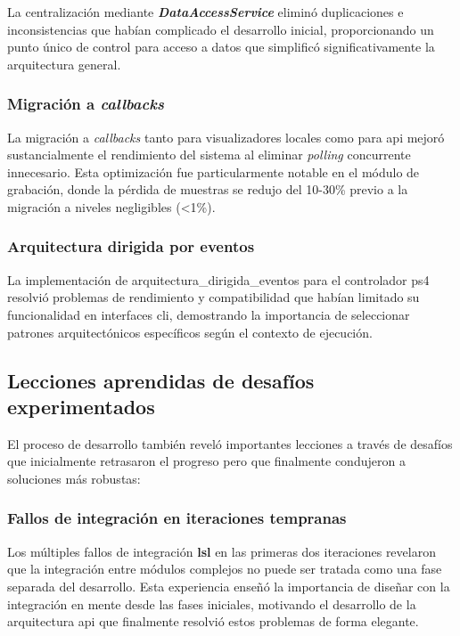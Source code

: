 La centralización mediante \textit{\textbf{DataAccessService}} eliminó duplicaciones e inconsistencias que habían complicado el desarrollo inicial, proporcionando un punto único de control para acceso a datos que simplificó significativamente la arquitectura general.

\subsubsection{Migración a \textit{\glspl{callback}}}
\label{subsubsec:migracion_callbacks}

La migración a \textit{\glspl{callback}} tanto para visualizadores locales como para \acrshort{api} mejoró sustancialmente el rendimiento del sistema al eliminar \textit{\gls{polling}} concurrente innecesario. Esta optimización fue particularmente notable en el módulo de grabación, donde la pérdida de muestras se redujo del 10-30\% previo a la migración a niveles negligibles (<1\%).

\subsubsection{Arquitectura dirigida por eventos}
\label{subsubsec:arquitectura_eventos}

La implementación de \gls{arquitectura_dirigida_eventos} para el controlador \acrshort{ps4} resolvió problemas de rendimiento y compatibilidad que habían limitado su funcionalidad en interfaces \acrshort{cli}, demostrando la importancia de seleccionar patrones arquitectónicos específicos según el contexto de ejecución.

\subsection{Lecciones aprendidas de desafíos experimentados}
\label{subsec:lecciones_desafios}

El proceso de desarrollo también reveló importantes lecciones a través de desafíos que inicialmente retrasaron el progreso pero que finalmente condujeron a soluciones más robustas:

\subsubsection{Fallos de integración en iteraciones tempranas}
\label{subsubsec:fallos_integracion}

Los múltiples fallos de integración \textbf{\acrshort{lsl}} en las primeras dos iteraciones revelaron que la integración entre módulos complejos no puede ser tratada como una fase separada del desarrollo. Esta experiencia enseñó la importancia de diseñar con la integración en mente desde las fases iniciales, motivando el desarrollo de la arquitectura \acrshort{api} que finalmente resolvió estos problemas de forma elegante.

